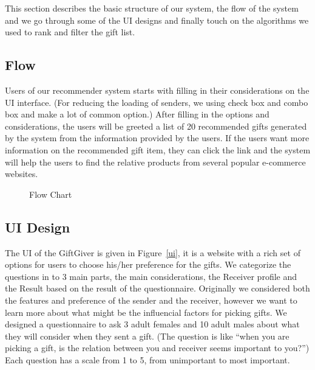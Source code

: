 \documentclass[11pt,twocolumn]{article}
\begin{document}
This section describes the basic structure of our system, the flow of the system and we go through some of the UI designs and finally touch on the algorithms we used to rank and filter the gift list.

\subsection{Flow}
Users of our recommender system starts with filling in their considerations on the UI interface. (For reducing the loading of senders, we using check box and combo box and make a lot of common option.)   
After filling in the options and considerations, the users will be greeted  a list of 20 recommended gifts generated by the system from the information provided by the users.
If the users want more information on the recommended gift item, they can click the link and the system will help the users to find the relative products from several popular e-commerce websites.

\begin{figure}[h!t]
\caption{Flow Chart}
\end{figure}


\subsection{UI Design}
The UI of the GiftGiver is given in Figure~\ref{ui}, it is a website with a rich set of options for users to choose his/her preference for the gifts. We categorize the questions in to 3 main parts, the main considerations, the Receiver profile and the Result based on the result of the questionnaire. Originally we considered both the features and preference of the sender and the receiver, however we want to learn more about what might be the influencial factors for picking gifts.  We designed a questionnaire to ask 3 adult females and 10 adult males about what they will consider when they sent a gift.
(The question is like “when you are picking a gift, is the relation between you and receiver seems important to you?”)   Each question has a scale from 1 to 5, from unimportant to most important.
\end{document}
